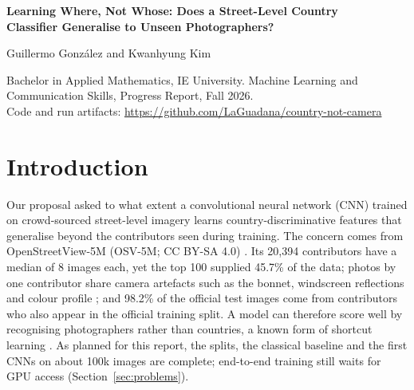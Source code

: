 \documentclass[9pt]{extarticle}
\begin{document}
\begin{center}
{\Large\bfseries Learning Where, Not Whose: Does a Street-Level Country\\[2pt]
Classifier Generalise to Unseen Photographers?\par}
\vspace{5pt}
{\normalsize Guillermo Gonz\'alez and Kwanhyung Kim\par}
\vspace{1pt}
{\small Bachelor in Applied Mathematics, IE University. Machine Learning and Communication
Skills, Progress Report, Fall 2026.\\
Code and run artifacts: \url{https://github.com/LaGuadana/country-not-camera}\par}
\end{center}
\vspace{-4pt}

\section{Introduction}
\label{sec:intro}
Our proposal asked to what extent a convolutional neural network (CNN) trained on
crowd-sourced street-level imagery learns country-discriminative features that generalise
beyond the contributors seen during training. The concern comes from OpenStreetView-5M
(OSV-5M; CC BY-SA 4.0) \citep{astruc2024osv5m}. Its 20{,}394 contributors have a median of 8 images each, yet
the top 100 supplied 45.7\% of the data; photos by one contributor share camera artefacts such
as the bonnet, windscreen reflections and colour profile \citep{lukas2006camera}; and 98.2\%
of the official test images come from contributors who also appear in the official training
split. A model can therefore score well by recognising photographers rather than countries, a
known form of shortcut learning
\citep{geirhos2020shortcut,torralba2011unbiased,zech2018pneumonia}. As planned for this
report, the splits, the classical baseline and the first CNNs on about 100k images are
complete; end-to-end training still waits for GPU access (Section~\ref{sec:problems}).
\end{document}
